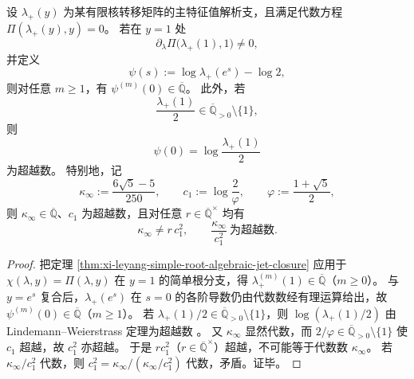 \begin{corollary}[有限核热力学的导数代数性与熵项超越性]\label{cor:xi-leyang-finite-kernel-algebraic-vs-transcendental-layering}
设 \(\lambda_+(y)\) 为某有限核转移矩阵的主特征值解析支，且满足代数方程 \(\Pi(\lambda_+(y),y)=0\)。
若在 \(y=1\) 处
\[
\partial_{\lambda}\Pi\!\bigl(\lambda_+(1),1\bigr)\neq0,
\]
并定义
\[
\psi(s):=\log\lambda_+(e^s)-\log2,
\]
则对任意 \(m\ge1\)，有 \(\psi^{(m)}(0)\in\overline{\mathbb Q}\)。
此外，若
\[
\frac{\lambda_+(1)}{2}\in\overline{\mathbb Q}_{>0}\setminus\{1\},
\]
则
\[
\psi(0)=\log\!\frac{\lambda_+(1)}{2}
\]
为超越数。
特别地，记
\[
\kappa_{\infty}:=\frac{6\sqrt5-5}{250},
\qquad
c_1:=\log\!\frac{2}{\varphi},
\qquad
\varphi:=\frac{1+\sqrt5}{2},
\]
则 \(\kappa_{\infty}\in\overline{\mathbb Q}\)、\(c_1\) 为超越数，且对任意 \(r\in\overline{\mathbb Q}^{\times}\) 均有
\[
\kappa_{\infty}\neq r\,c_1^{2},
\qquad
\frac{\kappa_{\infty}}{c_1^{2}}\ \text{为超越数}.
\]
\end{corollary}
\begin{proof}
把定理 \ref{thm:xi-leyang-simple-root-algebraic-jet-closure} 应用于 \(\chi(\lambda,y)=\Pi(\lambda,y)\) 在 \(y=1\) 的简单根分支，得 \(\lambda_+^{(m)}(1)\in\overline{\mathbb Q}\)（\(m\ge0\)）。
与 \(y=e^s\) 复合后，\(\lambda_+(e^s)\) 在 \(s=0\) 的各阶导数仍由代数数经有理运算给出，故 \(\psi^{(m)}(0)\in\overline{\mathbb Q}\)（\(m\ge1\)）。
若 \(\lambda_+(1)/2\in\overline{\mathbb Q}_{>0}\setminus\{1\}\)，则 \(\log(\lambda_+(1)/2)\) 由 Lindemann--Weierstrass 定理为超越数 \cite{Baker1975TranscendentalNumberTheory}。
又 \(\kappa_{\infty}\) 显然代数，而 \(2/\varphi\in\overline{\mathbb Q}_{>0}\setminus\{1\}\) 使 \(c_1\) 超越，故 \(c_1^2\) 亦超越。
于是 \(r c_1^2\)（\(r\in\overline{\mathbb Q}^{\times}\)）超越，不可能等于代数数 \(\kappa_{\infty}\)。
若 \(\kappa_{\infty}/c_1^2\) 代数，则 \(c_1^2=\kappa_{\infty}/(\kappa_{\infty}/c_1^2)\) 代数，矛盾。证毕。
\end{proof}

